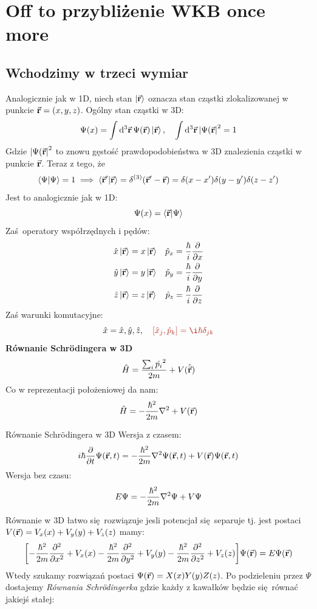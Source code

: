\documentclass[12pt,a4paper]{report}
\newcommand{\subind}[2]{{\color{blue} #1\index{#2}}}
\renewcommand{\emph}{\textbf}
\newcommand{\rket}{\ket{\va{r}}}
\newenvironment{lecture}[1]{\par\medskip
   \noindent\chapter{#1} \rmfamily}{\medskip}
\newenvironment{emph_box}[1]
    {\begin{center}\color{BrickRed}
    \begin{tabular}{|p{0.9\textwidth}|}
    \hline
    \begin{center} \color{Dandelion}{\textbf{#1}} \end{center}
    \begin{center}
    }
    {
    \end{center}
    \\\\\hline
    \end{tabular} 
    \end{center}
    \color{black}
    }
\begin{document}
\begin{lecture}{Off to przybliżenie WKB once more}
\section{Wchodzimy w trzeci wymiar}
Analogicznie jak w 1D, niech stan $\ket{\va{r}}$ oznacza stan cząstki zlokalizowanej w punkcie $\va{r} = (x,y,z)$. Ogólny stan cząstki w 3D:
\[
    \Psi(x) = \int \dd[3]{\va{r}} \Psi(\va{r}) \ket{\va{r}}\qc \int \dd[3]{\va{r}} \abs{\Psi(\va{r}}^2 = 1
\]
Gdzie $\abs{\Psi(\va{r}}^2$ to znowu gęstość prawdopodobieństwa w 3D znalezienia cząstki w punkcie $\va{r}$. Teraz z tego, że 
\[
\braket{\Psi} = 1 \implies \braket{\va{r}'}{\va{r}} = \delta^{(3)}(\va{r}'-\va{r}) = \delta(x - x') \delta(y - y')\delta(z-z')
\]
Jest to analogicznie jak w 1D:
\[
    \Psi(x) = \braket{\va{r}}{\Psi}
\]
Zaś operatory współrzędnych i pędów:
\begin{align*}
    \hat{x} \rket &= x \rket & \hat{p}_x &= \frac{\hbar}{i} \pdv{x}\\
    \hat{y} \rket &= y \rket & \hat{p}_y &= \frac{\hbar}{i} \pdv{y}\\
    \hat{z} \rket &= z \rket & \hat{p}_z &= \frac{\hbar}{i} \pdv{z}\\
\end{align*}
Zaś warunki komutacyjne:
\[
    \hat{x} = {\hat{x}, \hat{y} ,\hat{z}}\qc \color{BrickRed} \qty[\hat{x}_j, \hat{p}_k] = \i \hbar \delta_{jk}
\]
\emph{Równanie Schrödingera w 3D}
\[
    \hat{H} = \frac{\sum_i \hat{p_i}^2}{2m} + V(\hat{\va{r}})
\]
Co w reprezentacji położeniowej da nam:
\[
    \hat{H} = -\frac{\hbar^2}{2m} \laplacian + V(\va{r})
\]
\begin{emph_box}{\subind{Równanie Schrödingera w 3D}{Równanie!Schrödingera!W 3D}}
Wersja z czasem:
\begin{equation}
    i \hbar \pdv{t} \Psi(\va{r}, t) = - \frac{\hbar^2}{2m} \laplacian \Psi(\va{r}, t) + V(\va{r}) \Psi(\va{r}, t)
\label{eq:lec:13:schrodinger_3D}
\end{equation}
Wersja bez czasu:
\begin{equation}
    E \Psi = - \frac{\hbar^2}{2m} \laplacian \Psi + V \Psi
\label{eq:lec:13:schrodinger_3D_b_czasu}
\end{equation}
\end{emph_box}
Równanie w 3D łatwo się rozwiązuje jesli potencjał się separuje tj. jest postaci $V(\va{r}) = V_x(x) + V_y(y) + V_z(z)$ mamy:
\[
    \qty[-\frac{\hbar^2}{2m} \pdv[2]{x} + V_x(x) -\frac{\hbar^2}{2m} \pdv[2]{y} + V_y(y) -\frac{\hbar^2}{2m} \pdv[2]{z} + V_z(z)]\Psi(\va{r}) = E \Psi(\va{r})
\]
Wtedy szukamy rozwiązań postaci $\Psi(\va{r}) = X(x) Y(y)Z(z)$. Po podzieleniu przez $\Psi$ dostajemy \textit{Równania Schrödingerka} gdzie każdy z kawałków będzie się równać jakiejś stałej:

\end{lecture}
\end{document}

